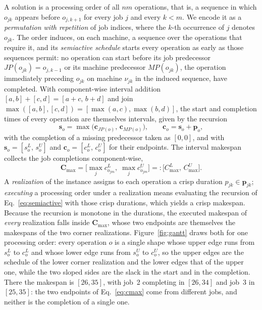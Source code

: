 \documentclass[preprint,12pt]{elsarticle}
\newcommand{\Cmax}{\mathbf{C}_{\max}}
\theoremstyle{definition}
\theoremstyle{remark}
\begin{document}
A solution is a processing order of all $nm$ operations, that is, a
sequence in which $o_{jk}$ appears before $o_{j,k+1}$ for every job
$j$ and every $k<m$. We encode it as a \emph{permutation with
repetition} of job indices, where the $k$-th occurrence of $j$
denotes $o_{jk}$. The order induces, on each machine, a sequence over
the operations that require it, and its \emph{semiactive schedule}
starts every operation as early as those sequences permit: no
operation can start before its job predecessor $JP(o_{jk})=o_{j,k-1}$
or its machine predecessor $MP(o_{jk})$, the operation immediately
preceding $o_{jk}$ on machine $\nu_{jk}$ in the induced sequence,
have completed. With component-wise interval
addition $[a,b]+[c,d]=[a+c,\,b+d]$ and join
$\max([a,b],[c,d])=[\max(a,c),\max(b,d)]$, the start and completion
times of every operation are themselves intervals, given by the
recursion
\begin{equation}
\mathbf{s}_{o}=\max\!\big(\mathbf{c}_{JP(o)},\,\mathbf{c}_{MP(o)}\big),
\qquad
\mathbf{c}_{o}=\mathbf{s}_{o}+\mathbf{p}_{o},
\label{eq:semiactive}
\end{equation}
with the completion of a missing predecessor taken as $[0,0]$, and
with $\mathbf{s}_{o}=[s^{L}_{o},\,s^{U}_{o}]$ and
$\mathbf{c}_{o}=[c^{L}_{o},\,c^{U}_{o}]$ for their endpoints.
The interval makespan collects the job completions component-wise,
\begin{equation}
\Cmax=\Big[\max_{j} c^{L}_{o_{jm}},\;\max_{j} c^{U}_{o_{jm}}\Big]
=:\big[C^{L}_{\max},\,C^{U}_{\max}\big].
\label{eq:cmax}
\end{equation}
A \emph{realization} of the instance assigns to each operation a
crisp duration $p_{jk}\in\mathbf{p}_{jk}$; \emph{executing} a
processing order under a realization means evaluating the recursion
of Eq.~\eqref{eq:semiactive} with those crisp durations, which yields
a crisp makespan. Because the recursion is monotone in the durations,
the executed makespan of \emph{every} realization falls inside
$\Cmax$, whose two endpoints are themselves the makespans of the two
corner realizations. Figure~\ref{fig:gantt} draws both for one
processing order: every operation $o$ is a single shape whose upper
edge runs from $s^{L}_{o}$ to $c^{L}_{o}$ and whose lower edge runs
from $s^{U}_{o}$ to $c^{U}_{o}$, so the upper edges are the schedule
of the lower corner realization and the lower edges that of the
upper one, while the two sloped sides are the slack in the start and
in the completion. There the makespan is $[26,35]$, with job~2
completing in $[26,34]$ and job~3 in $[25,35]$: the two endpoints of
Eq.~\eqref{eq:cmax} come from different jobs, and neither is the
completion of a single one.
\end{document}
